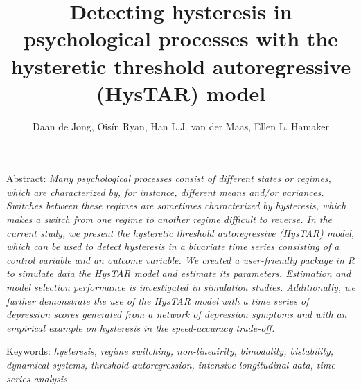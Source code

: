 \documentclass{article}
\title{Detecting hysteresis in psychological processes with the hysteretic threshold autoregressive (HysTAR) model}
\author{Daan de Jong, Ois\'{i}n Ryan, Han L.J. van der Maas, Ellen L. Hamaker}
\begin{document}

%
\maketitle


Abstract:
\textit{
Many psychological processes consist of different states or regimes, which are characterized by, for instance, different means and/or variances. 
Switches between these regimes are sometimes characterized by hysteresis, which makes a switch from one regime to another regime difficult to reverse. 
In the current study, we present the hysteretic threshold autoregressive (HysTAR) model, which can be used to detect hysteresis in a bivariate time series consisting of a control variable and an outcome variable. 
We created a user-friendly package in \textsf{R} to simulate data the HysTAR model and estimate its parameters. 
Estimation and model selection performance is investigated in simulation studies. 
Additionally, we further demonstrate the use of the HysTAR model with a time series of depression scores generated from a network of depression symptoms and with an empirical example on hysteresis in the speed-accuracy trade-off.
}

Keywords: \textit{hysteresis, regime switching, non-lineairity, bimodality, bistability, dynamical systems, threshold autoregression, intensive longitudinal data, time series analysis}
\end{document}

